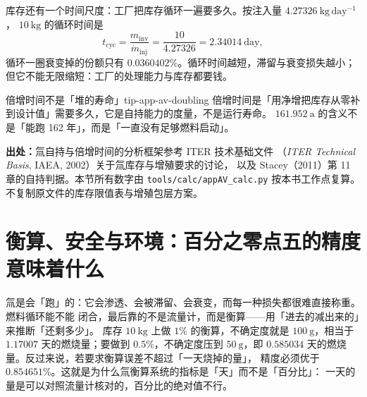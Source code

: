 库存还有一个时间尺度：工厂把库存循环一遍要多久。按注入量 $4.27326\ \mathrm{kg\,day^{-1}}$，
$10\ \mathrm{kg}$ 的循环时间是
\begin{equation}
t_\mathrm{cyc}=\frac{m_\mathrm{inv}}{\dot m_\mathrm{inj}}
=\frac{10}{4.27326}=2.34014\ \mathrm{day},
\label{eq:app-av-cycle}
\end{equation}
循环一圈衰变掉的份额只有 $0.0360402\%$。循环时间越短，滞留与衰变损失越小；
但它不能无限缩短：工厂的处理能力与库存都要钱。

\begin{tip}{倍增时间不是「堆的寿命」}{tip-app-av-doubling}
倍增时间是「用净增把库存从零补到设计值」需要多久，它是自持能力的度量，不是运行寿命。
$161.952\ \mathrm{a}$ 的含义不是「能跑 162 年」，而是「一直没有足够燃料启动」。
\end{tip}

{\footnotesize
\textbf{出处：}氚自持与倍增时间的分析框架参考 ITER 技术基础文件
（\emph{ITER Technical Basis}, IAEA, 2002）关于氚库存与增殖要求的讨论，
以及 Stacey（2011）第 11 章的自持判据。本节所有数字由
\texttt{tools/\allowbreak{}calc/\allowbreak{}appAV\_calc.py} 按本书工作点复算。
不复制原文件的库存限值表与增殖包层方案。
\section{衡算、安全与环境：百分之零点五的精度意味着什么}
\label{sec:app-av-account}
}

氚是会「跑」的：它会渗透、会被滞留、会衰变，而每一种损失都很难直接称重。燃料循环能不能
闭合，最后靠的不是流量计，而是衡算——用「进去的减出来的」来推断「还剩多少」。
库存 $10\ \mathrm{kg}$ 上做 $1\%$ 的衡算，不确定度就是 $100\ \mathrm{g}$，相当于
$1.17007$ 天的燃烧量；要做到 $0.5\%$，不确定度压到 $50\ \mathrm{g}$，即
$0.585034$ 天的燃烧量。反过来说，若要求衡算误差不超过「一天烧掉的量」，
精度必须优于 $0.854651\%$。这就是为什么氚衡算系统的指标是「天」而不是「百分比」：
一天的量是可以对照流量计核对的，百分比的绝对值不行。

